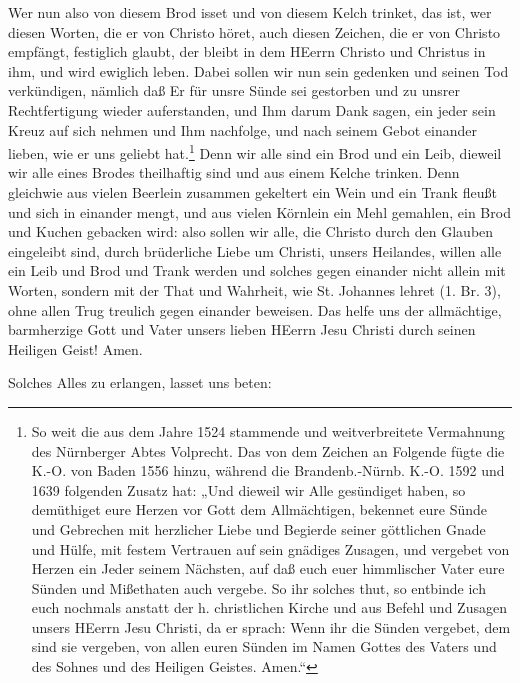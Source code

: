 Wer nun also von diesem Brod isset und von diesem Kelch trinket, das ist, wer diesen Worten, die er von Christo höret, auch diesen Zeichen, die er von Christo empfängt, festiglich glaubt, der bleibt in dem HEerrn Christo und Christus in ihm, und wird ewiglich leben. Dabei sollen wir nun sein gedenken und seinen Tod verkündigen, nämlich daß Er für unsre Sünde sei gestorben und zu unsrer Rechtfertigung wieder auferstanden, und Ihm darum Dank sagen, ein jeder sein Kreuz auf sich nehmen und Ihm nachfolge, und nach seinem Gebot einander lieben, wie er uns geliebt hat.\footnote{So weit die aus dem Jahre 1524 stammende und weitverbreitete Vermahnung des Nürnberger Abtes Volprecht. Das von dem Zeichen an Folgende fügte die K.-O. von Baden 1556 hinzu, während die Brandenb.-Nürnb. K.-O. 1592 und 1639 folgenden Zusatz hat: „Und dieweil wir Alle gesündiget haben, so demüthiget eure Herzen vor Gott dem Allmächtigen, bekennet eure Sünde und Gebrechen mit herzlicher Liebe und Begierde seiner göttlichen Gnade und Hülfe, mit festem Vertrauen auf sein gnädiges Zusagen, und vergebet von Herzen ein Jeder seinem Nächsten, auf daß euch euer himmlischer Vater eure Sünden und Mißethaten auch vergebe. So ihr solches thut, so entbinde ich euch nochmals anstatt der h. christlichen Kirche und aus Befehl und Zusagen unsers HEerrn Jesu Christi, da er sprach: Wenn ihr die Sünden vergebet, dem sind sie vergeben, von allen euren Sünden im Namen Gottes des Vaters und des Sohnes und des Heiligen Geistes. Amen.“} Denn wir alle sind ein Brod und ein Leib, dieweil wir alle eines Brodes theilhaftig sind und aus einem Kelche trinken. Denn gleichwie aus vielen Beerlein zusammen gekeltert ein Wein und ein Trank fleußt und sich in einander mengt, und aus vielen Körnlein ein Mehl gemahlen, ein Brod und Kuchen gebacken wird: also sollen wir alle, die Christo durch den Glauben eingeleibt sind, durch brüderliche Liebe um Christi, unsers Heilandes, willen alle ein Leib und Brod und Trank werden und solches gegen einander nicht allein mit Worten, sondern mit der That und Wahrheit, wie St. Johannes lehret (1. Br. 3), ohne allen Trug treulich gegen einander beweisen. Das helfe uns der allmächtige, barmherzige Gott und Vater unsers lieben HEerrn Jesu Christi durch seinen Heiligen Geist! Amen.

Solches Alles zu erlangen, lasset uns beten:

